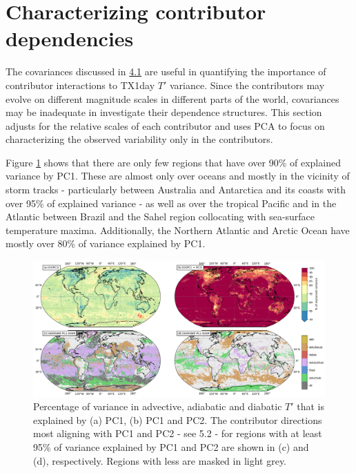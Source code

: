 \documentclass[11pt,a4paper,twoside,openright]{report}
\theoremstyle{definition}
\begin{document}
\section{Characterizing contributor dependencies}\label{characterizing-contributor-dependencies}

The covariances discussed in \hyperref[relating-tx1day-t-variability-to-component-variability]{4.1} are useful in quantifying the importance of contributor interactions to TX1day \(T'\) variance. Since the contributors may evolve on different magnitude scales in different parts of the world, covariances may be inadequate in investigate their dependence structures. This section adjusts for the relative scales of each contributor and uses PCA to focus on characterizing the observed variability only in the contributors.

Figure \ref{fig:pcaexplainedvar} shows that there are only few regions that have over 90\% of explained variance by PC1. These are almost only over oceans and mostly in the vicinity of storm tracks - particularly between Australia and Antarctica and its coasts with over 95\% of explained variance - as well as over the tropical Pacific and in the Atlantic between Brazil and the Sahel region collocating with sea-surface temperature maxima. Additionally, the Northern Atlantic and Arctic Ocean have mostly over 80\% of variance explained by PC1.

\begin{figure}[h]
\includegraphics[width=1\linewidth]{images/pca_explainedvar3} \caption{Percentage of variance in advective, adiabatic and diabatic $T'$ that is explained by (a) PC1, (b) PC1 and PC2. The contributor directions most aligning with PC1 and PC2 - see 5.2 - for regions with at least 95\% of variance explained by PC1 and PC2 are shown in (c) and (d), respectively. Regions with less are masked in light grey.}\label{fig:pcaexplainedvar}
\end{figure}
\end{document}
